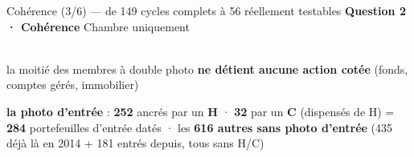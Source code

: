 \documentclass[11pt,aspectratio=169]{beamer}
\newcommand{\badgel}[2]{\colorbox{#1}{\textcolor{black!80}{\footnotesize\textbf{#2}}}}
\begin{document}
\begin{frame}{Cohérence (3/6) --- de 149 cycles complets à 56 réellement testables}
  \badgel{okgreen!30}{Question 2 · Cohérence}\hfill{\scriptsize\color{black!55} Chambre uniquement}\\[3mm]
  \centering
  \\[2mm]
  {\footnotesize la moitié des membres à double photo \textbf{ne détient aucune action cotée} (fonds, comptes gérés, immobilier)}\\[3.5mm]
  \colorbox{black!6}{\parbox{0.9\textwidth}{\footnotesize\centering\vspace{0.5mm}
    \textbf{la photo d'entrée} : \textbf{252} ancrés par un \textbf{H} · \textbf{32} par un \textbf{C} (dispensés de H)
    = \textbf{284} portefeuilles d'entrée datés · les \textbf{616 autres sans photo d'entrée} (435 déjà là en 2014 + 181 entrés depuis, tous sans H/C)\vspace{0.5mm}}}
\end{frame}
\end{document}
